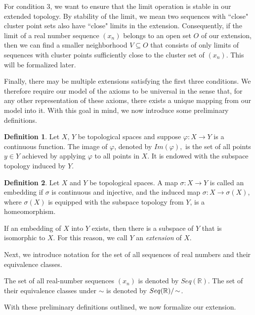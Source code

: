 \documentclass{amsart}
\theoremstyle{definition}
\newtheorem{definition}{Definition}
\theoremstyle{plain}
\begin{document}
For condition 3, we want to ensure that the limit operation is stable in our extended 
topology. By stability of the limit, we mean two sequences with ``close" cluster point sets also have ``close" limits in the extension. Consequently, if the limit of a real number sequence $(x_n)$ belongs to
an open set $O$ of our extension, then we can find a smaller neighborhood $V\subseteq O$ that  
consists of only limits of sequences with cluster points sufficiently close to the cluster set of $(x_n)$. This will be 
formalized later. 

Finally, there may be multiple extensions satisfying the first three conditions. We therefore require our model of the axioms to be universal in the sense that, for any other representation of these axioms, there exists a unique mapping from our model into it. With this goal in mind, we now introduce some preliminary definitions.






\begin{definition} Let $X$, $Y$ be  topological spaces and suppose $\varphi: X \to Y$ is a continuous function. The image of $\varphi$, denoted by 
$Im(\varphi),$ is the set of all points $y \in Y$ achieved by applying $\varphi$ to all points in $X$. It is 
endowed with the subspace topology induced by $Y.$
   
\end{definition}

\begin{definition} Let $X$ and $Y$ be topological spaces. 
A map $\sigma: X\to Y$ is called an embedding if $\sigma$ is continuous and injective, and the induced map  $\sigma: X\to \sigma(X)$, where $\sigma(X)$ is equipped with the subspace topology from $Y$, is a homeomorphism.
\end{definition}
If an embedding of $X$ into $Y$ exists, then there is a subspace of 
$Y$ that is isomorphic to  $X$. For this reason, we call $Y$ an \emph{extension} of $X$.

Next, we introduce  notation for the set of 
all sequences of real numbers and their equivalence classes.

 The set of all real-number sequences $(x_n)$ is denoted by $Seq(\mathbb{R})$. 
The set of their equivalence classes under $\sim$ is denoted by $Seq(\mathbb{R})/\hspace{-0.5mm}\sim$.


With these preliminary definitions outlined, we now formalize our extension.
\end{document}
